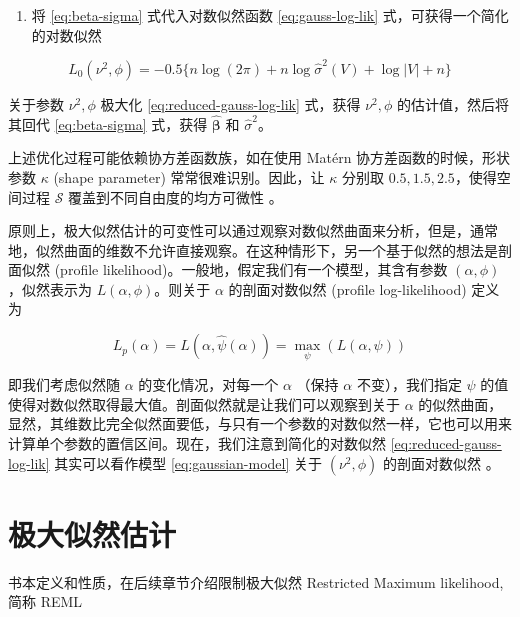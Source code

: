 \documentclass[12pt,a4paper,UTF8,twoside]{book}
\providecommand{\tightlist}{%
  \setlength{\itemsep}{0pt}\setlength{\parskip}{0pt}}
\theoremstyle{definition}
\theoremstyle{definition}
\theoremstyle{definition}
\theoremstyle{remark}
\begin{document}
\begin{enumerate}
\def\labelenumi{\arabic{enumi}.}
\setcounter{enumi}{2}
\tightlist
\item
  将 \eqref{eq:beta-sigma} 式代入对数似然函数 \eqref{eq:gauss-log-lik}
  式，可获得一个简化的对数似然
\end{enumerate}

\begin{equation}
L_{0}(\nu^2,\phi) = - 0.5\{ n\log(2\pi) + n\log \hat{\sigma}^2(V) + \log |V| + n \}
\label{eq:reduced-gauss-log-lik}
\end{equation}

关于参数 \(\nu^2,\phi\) 极大化 \eqref{eq:reduced-gauss-log-lik} 式，获得
\(\nu^2,\phi\) 的估计值，然后将其回代 \eqref{eq:beta-sigma} 式，获得
\(\hat{\boldsymbol{\beta}}\) 和 \(\hat{\sigma}^2\)。

上述优化过程可能依赖协方差函数族，如在使用 Matérn
协方差函数的时候，形状参数 \(\kappa\) (shape parameter)
常常很难识别。因此，让 \(\kappa\) 分别取 \(0.5,1.5,2.5\)，使得空间过程
\(\mathcal{S}\) 覆盖到不同自由度的均方可微性 \citep{Warnes1987}。

原则上，极大似然估计的可变性可以通过观察对数似然曲面来分析，但是，通常地，似然曲面的维数不允许直接观察。在这种情形下，另一个基于似然的想法是剖面似然
(profile likelihood)。一般地，假定我们有一个模型，其含有参数
\((\alpha,\phi)\)，似然表示为 \(L(\alpha,\phi)\)。则关于 \(\alpha\)
的剖面对数似然 (profile log-likelihood) 定义为

\begin{equation}
L_{p}(\alpha) = L(\alpha,\hat{\psi}(\alpha)) = \max_{\psi} (L(\alpha,\psi))
\label{eq:profile-log-lik}
\end{equation}

即我们考虑似然随 \(\alpha\) 的变化情况，对每一个 \(\alpha\) （保持
\(\alpha\) 不变），我们指定 \(\psi\)
的值使得对数似然取得最大值。剖面似然就是让我们可以观察到关于 \(\alpha\)
的似然曲面，显然，其维数比完全似然面要低，与只有一个参数的对数似然一样，它也可以用来计算单个参数的置信区间。现在，我们注意到简化的对数似然
\eqref{eq:reduced-gauss-log-lik} 其实可以看作模型 \eqref{eq:gaussian-model}
关于 \((\nu^2,\phi)\) 的剖面对数似然 \citep{Diggle2007}。

\hypertarget{maximum-likelihood-estimates}{%
\section{极大似然估计}\label{maximum-likelihood-estimates}}

书本定义和性质，在后续章节介绍限制极大似然 Restricted Maximum
likelihood, 简称 REML
\end{document}
